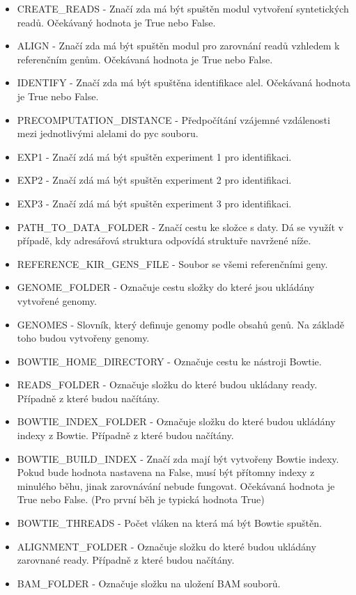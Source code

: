 \documentclass[czech,DP]{thesiskiv}
\numberwithin{equation}{section}
\begin{document}
\begin{itemize}
	\item CREATE\_READS - Značí zda má být spuštěn modul vytvoření syntetických readů. Očekávaný hodnota je True nebo False.
	\item ALIGN - Značí zda má být spuštěn modul pro zarovnání readů vzhledem k referenčním genům. Očekávaná hodnota je True nebo False.
	\item IDENTIFY - Značí zda má být spuštěna identifikace alel. Očekávaná hodnota je True nebo False.
	\item PRECOMPUTATION\_DISTANCE - Předpočítání vzájemné vzdálenosti mezi jednotlivými alelami do pyc souboru. 
	\item EXP1 - Značí zdá má být spuštěn experiment 1 pro identifikaci.
	\item EXP2 - Značí zdá má být spuštěn experiment 2 pro identifikaci.
	\item EXP3 - Značí zdá má být spuštěn experiment 3 pro identifikaci.
	\item PATH\_TO\_DATA\_FOLDER - Značí cestu ke složce s daty. Dá se využít v případě, kdy adresářová struktura odpovídá struktuře navržené níže.
	\item REFERENCE\_KIR\_GENS\_FILE - Soubor se všemi referenčními geny. 
	\item GENOME\_FOLDER - Označuje cestu složky do které jsou ukládány vytvořené genomy. 
	\item GENOMES - Slovník, který definuje genomy podle obsahů genů. Na základě toho budou vytvořeny genomy.
	\item BOWTIE\_HOME\_DIRECTORY - Označuje cestu ke nástroji Bowtie.
	\item READS\_FOLDER - Označuje složku do které budou ukládany ready. Případně z které budou načítány.
	\item BOWTIE\_INDEX\_FOLDER - Označuje složku do které budou ukládány indexy z Bowtie. Případně z které budou načítány. 
	\item BOWTIE\_BUILD\_INDEX - Značí zda mají být vytvořeny Bowtie indexy. Pokud bude hodnota nastavena na False, musí být přítomny indexy z minulého běhu, jinak zarovnávání nebude fungovat. Očekávaná hodnota je True nebo False. (Pro první běh je typická hodnota True)
	\item BOWTIE\_THREADS - Počet vláken na která má být Bowtie spuštěn.	
	\item ALIGNMENT\_FOLDER - Označuje složku do které budou ukládány zarovnané ready. Případně z které budou načítány. 
	\item BAM\_FOLDER - Označuje složku na uložení BAM souborů.  

\end{itemize}
\end{document}
